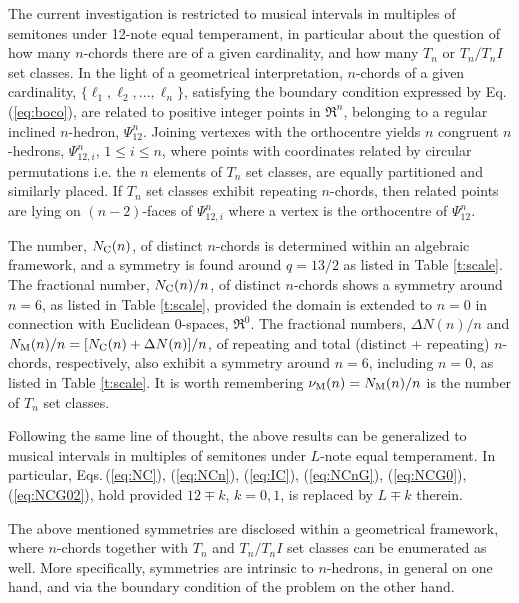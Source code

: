 \documentclass[12pt,a4paper]{article}
\begin{document}
The current investigation is restricted to musical intervals in
multiples of semitones under 12-note equal temperament, in particular about
the question of how many $n$-chords there are of
a given cardinality, and how many $T_n$ or $T_n/T_nI$ set classes.   In the
light of a geometrical interpretation, $n$-chords of a given cardinality,
$\{\ell_1,\ell_2,...,\ell_n\}$, satisfying the boundary condition expressed by
Eq.\,(\ref{eq:boco}), are related to positive integer points in $\Re^n$,
belonging to a regular inclined $n$-hedron, $\Psi_{12}^n$.   Joining vertexes
with the orthocentre yields $n$ congruent $n$-hedrons, $\Psi_{12,i}^n$,
$1\le i\le n$, where points with
coordinates related by circular permutations i.e. the $n$ elements of $T_n$
set classes, are equally partitioned and similarly placed.   If $T_n$
set classes exhibit repeating $n$-chords, then related points are lying on
$(n-2)$-faces of $\Psi_{12,i}^n$ where a vertex is the orthocentre of
$\Psi_{12}^n$.

The number, $N_{\rm C}(n)$, of distinct $n$-chords is determined within an 
algebraic framework, and a symmetry is found around $q=13/2$ as
listed in Table \ref{t:scale}.   The fractional
number, $N_{\rm C}(n)/n$, of distinct $n$-chords shows a symmetry around
$n=6$, as
listed in Table \ref{t:scale},
provided the domain is extended to $n=0$ in connection with Euclidean
0-spaces, $\Re^0$.   The fractional numbers, $\Delta N(n)/n$ and
$N_{\rm M}(n)/n=[N_{\rm C}(n)+\Delta N(n)]/n$, of repeating and total
(distinct + repeating) $n$-chords, respectively, also exhibit a symmetry
around $n=6$, including $n=0$, as
listed in Table \ref{t:scale}.
It is worth remembering $\nu_{\rm M}(n)=N_{\rm M}(n)/n$ is the number of
$T_n$ set classes.

Following the same line of thought, the above results can be generalized to
musical intervals in multiples of semitones under $L$-note equal
temperament.   In particular,
Eqs.\,(\ref{eq:NC}), (\ref{eq:NCn}), (\ref{eq:IC}), (\ref{eq:NCnG}),
(\ref{eq:NCG0}), (\ref{eq:NCG02}), hold provided $12\mp k$, $k=0,1$,
is replaced by $L\mp k$ therein.

The above mentioned symmetries are disclosed within a geometrical framework,
where $n$-chords together with $T_n$ and $T_n/T_nI$ set classes can be
enumerated as well.   More
specifically, symmetries are intrinsic to $n$-hedrons, in general on one
hand, and via the boundary condition of the problem on the other hand.
\end{document}
